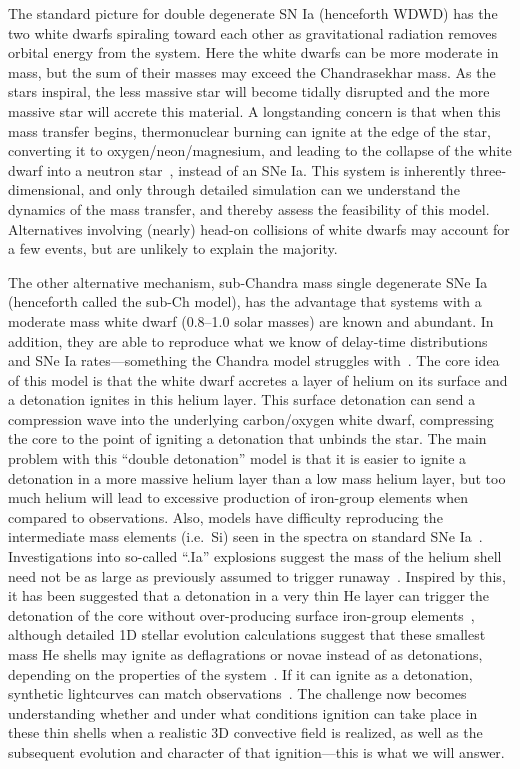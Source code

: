 The standard picture for double degenerate SN Ia (henceforth WDWD) has the
two white dwarfs spiraling toward each other as gravitational radiation
removes orbital energy from the system.  Here the white dwarfs can be more
moderate in mass, but the sum of their masses may exceed the
Chandrasekhar mass.  As the stars inspiral, the less massive star will
become tidally disrupted and the more massive star will accrete this
material.  A longstanding concern is that when this mass transfer
begins, thermonuclear burning can ignite at the edge of the star,
converting it to oxygen/neon/magnesium, and leading to the collapse of
the white dwarf into a neutron
star~\cite{saionomoto:2004,fryerdiehl:2008}, instead of an SNe Ia.
This system is inherently three-dimensional, and only through detailed
simulation can we understand the dynamics of the mass transfer, and
thereby assess the feasibility of this model.  Alternatives involving
(nearly) head-on collisions of white dwarfs may account for a few
events, but are unlikely to explain the majority.

The other alternative mechanism, sub-Chandra mass single degenerate SNe
Ia~\cite{fink:2010,shen:2010,sim:2012} (henceforth called the sub-Ch
model), has the advantage that systems with a moderate mass white dwarf
(0.8--1.0 solar masses) are known and abundant.  In addition, they are
able to reproduce what we know of delay-time distributions and SNe Ia
rates---something the Chandra model struggles with~\cite{ruiter:2011}.
The core idea of this model is that the white dwarf accretes a layer
of helium on its surface and a detonation ignites in this helium
layer.  This surface detonation can send a compression wave into the
underlying carbon/oxygen white dwarf, compressing the core to the point 
of igniting a detonation that unbinds the star. The main
problem with this ``double detonation'' 
model is that it is easier to ignite a detonation in
a more massive helium layer than a low mass helium layer, but too much
helium will lead to excessive production of iron-group elements when
compared to observations. Also, 
models have difficulty reproducing the intermediate mass elements 
(i.e.\ Si) seen in the spectra on standard SNe
Ia~\cite{hoeflich:1996,nugent:1997,kromer:2010}.  
Investigations into 
so-called ``.Ia'' explosions suggest the mass of the helium shell need
not be as large as previously assumed to trigger
runaway~\cite{bildsten:2007}.  Inspired by this, it has been suggested
that a detonation in a very thin He layer can trigger the detonation
of the core without over-producing surface iron-group
elements~\cite{fink:2010}, although detailed 1D stellar evolution
calculations suggest that these smallest mass He shells may ignite as
deflagrations or novae instead of as detonations, depending on the
properties of the system~\cite{woosleykasen:2010}.  If it can ignite
as a detonation, synthetic lightcurves can match
observations~\cite{kromer:2010}.  The challenge now becomes
understanding whether and under what conditions ignition can take
place in these thin shells when a realistic 3D convective field is
realized, as well as the subsequent evolution and character of that
ignition---this is what we will answer.

